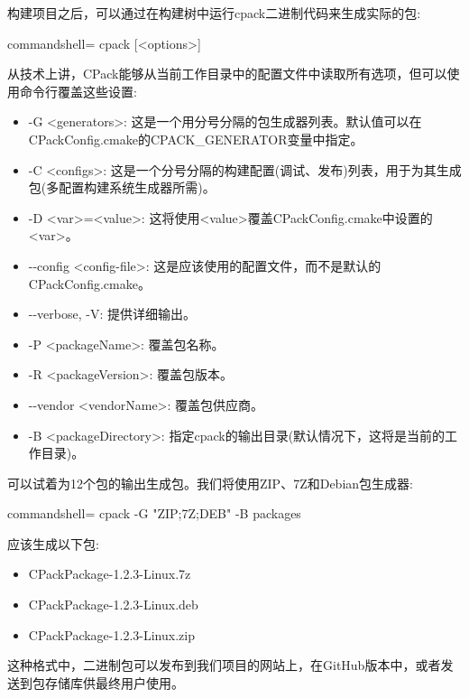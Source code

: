 构建项目之后，可以通过在构建树中运行cpack二进制代码来生成实际的包:

\begin{tcblisting}{commandshell={}}
cpack [<options>]
\end{tcblisting}

从技术上讲，CPack能够从当前工作目录中的配置文件中读取所有选项，但可以使用命令行覆盖这些设置:

\begin{itemize}
\item 
-G <generators>: 这是一个用分号分隔的包生成器列表。默认值可以在CPackConfig.cmake的CPACK\_GENERATOR变量中指定。

\item 
-C <configs>: 这是一个分号分隔的构建配置(调试、发布)列表，用于为其生成包(多配置构建系统生成器所需)。

\item 
-D <var>=<value>: 这将使用<value>覆盖CPackConfig.cmake中设置的<var>。

\item 
-{}-config <config-file>: 这是应该使用的配置文件，而不是默认的CPackConfig.cmake。

\item 
-{}-verbose, -V: 提供详细输出。

\item 
-P <packageName>: 覆盖包名称。

\item 
-R <packageVersion>: 覆盖包版本。

\item 
-{}-vendor <vendorName>: 覆盖包供应商。

\item 
-B <packageDirectory>: 指定cpack的输出目录(默认情况下，这将是当前的工作目录)。
\end{itemize}

可以试着为12个包的输出生成包。我们将使用ZIP、7Z和Debian包生成器:

\begin{tcblisting}{commandshell={}}
cpack -G "ZIP;7Z;DEB" -B packages
\end{tcblisting}

应该生成以下包:

\begin{itemize}
\item 
CPackPackage-1.2.3-Linux.7z

\item 
CPackPackage-1.2.3-Linux.deb

\item 
CPackPackage-1.2.3-Linux.zip
\end{itemize}

这种格式中，二进制包可以发布到我们项目的网站上，在GitHub版本中，或者发送到包存储库供最终用户使用。












